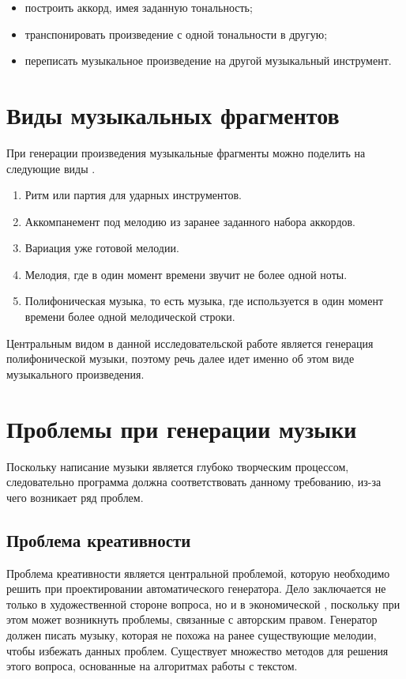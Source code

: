 \begin{itemize}
    \item построить аккорд, имея заданную тональность;
    \item транспонировать произведение с одной тональности в другую;
    \item переписать музыкальное произведение на другой музыкальный инструмент.
\end{itemize}


\section{Виды музыкальных фрагментов}

При генерации произведения музыкальные фрагменты можно поделить на следующие виды \cite{music-types}.

\begin{enumerate}
    \item Ритм или партия для ударных инструментов.
    \item Аккомпанемент под мелодию из заранее заданного набора аккордов.
    \item Вариация уже готовой мелодии.
    \item Мелодия, где в один момент времени звучит не более одной ноты.
    \item Полифоническая музыка, то есть музыка, где используется в один момент времени более одной мелодической строки.
\end{enumerate}

Центральным видом в данной исследовательской работе является генерация полифонической музыки, поэтому речь далее идет именно об этом виде музыкального произведения.

\section{Проблемы при генерации музыки}

Поскольку написание музыки является глубоко творческим  процессом, следовательно программа должна соответствовать данному требованию, из-за чего возникает ряд проблем.

\subsection{Проблема креативности}

Проблема креативности является центральной проблемой, которую необходимо решить при проектировании автоматического генератора. Дело заключается не только в художественной стороне вопроса, но и в экономической \cite{music-issues}, поскольку при этом может возникнуть проблемы, связанные с авторским правом. Генератор должен писать музыку, которая не похожа на ранее существующие мелодии, чтобы избежать данных проблем. Существует множество методов для решения этого вопроса, основанные на алгоритмах работы с текстом.

